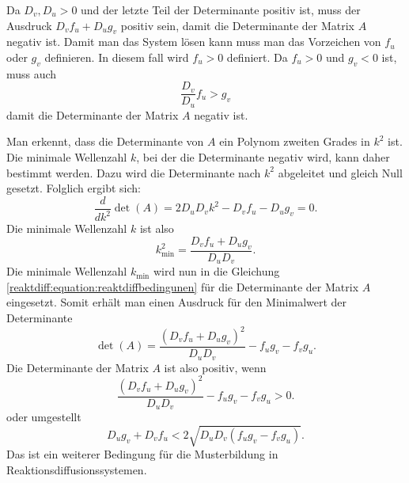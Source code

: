 Da \(D_v,D_u > 0\) und der letzte Teil der Determinante positiv ist, muss der Ausdruck \(D_v f_u + D_u g_v\) positiv sein, damit die Determinante der Matrix \(A\) negativ ist.
Damit man das System lösen kann muss man das Vorzeichen von \(f_u\) oder \(g_v\) definieren.
In diesem fall wird \(f_u > 0\) definiert.
Da \(f_u > 0\) und \(g_v < 0\) ist, muss auch
\begin{equation}
    \frac{D_v}{D_u}f_u > g_v
\end{equation}
damit die Determinante der Matrix \(A\) negativ ist.

Man erkennt, dass die Determinante von \(A\) ein Polynom zweiten Grades in \(k^2\) ist.  
Die minimale Wellenzahl \(k\), bei der die Determinante negativ wird, kann daher bestimmt werden.  
Dazu wird die Determinante nach \(k^2\) abgeleitet und gleich Null gesetzt.  
Folglich ergibt sich:
\begin{equation*}
    \frac{d}{dk^2} \det(A) = 2 D_u D_v k^2 - D_v f_u - D_u g_v = 0.
\end{equation*}
Die minimale Wellenzahl \(k\) ist also
\begin{equation*}
    k^2_{\text{min}} = \frac{D_v f_u + D_u g_v}{D_u D_v}.
\end{equation*}
Die minimale Wellenzahl \(k_{\text{min}}\) wird nun in die Gleichung \eqref{reaktdiff:equation:reaktdiffbedingunen} für die Determinante der Matrix \(A\) eingesetzt.
Somit erhält man einen Ausdruck für den Minimalwert der Determinante
\begin{equation*}
    \det(A) = \frac{(D_v f_u + D_u g_v)^2}{D_u D_v} - f_u g_v - f_v g_u.
\end{equation*}
Die Determinante der Matrix \(A\) ist also positiv, wenn
\begin{equation*}
    \frac{(D_v f_u + D_u g_v)^2}{D_u D_v} - f_u g_v - f_v g_u > 0.
\end{equation*}
oder umgestellt
\begin{equation*}
    D_u g_v+D_v f_u < 2\sqrt{D_u D_v(f_u g_v - f_v g_u)}.
\end{equation*}
Das ist ein weiterer Bedingung für die Musterbildung in Reaktionsdiffusionssystemen.

